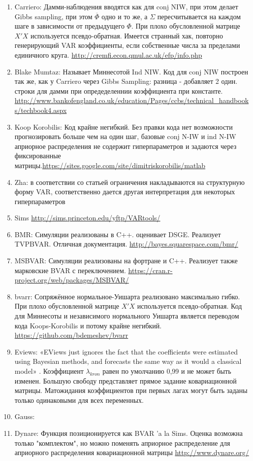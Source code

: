 \documentclass[11pt]{article} %
\newcommand{\post}{\overline}
\begin{document}
\begin{enumerate}
\item Carriero: Дамми-наблюдения вводятся как для conj NIW, при этом делает Gibbs sampling, при этом $\post\Phi$ одно и то же, а $\Sigma$ пересчитывается на каждом шаге в зависимости от предыдущего $\Phi$. При плохо обусловленной матрице $X'X$ используется псевдо-обратная. Имеется странный хак, повторно генерирующий VAR коэффициенты, если собственные числа за пределами единичного круга. \url{http://cremfi.econ.qmul.ac.uk/efp/info.php} 
\item Blake Mumtaz: Называет Миннесотой Ind NIW.  Код для conj NIW построен так же, как у Carriero через Gibbs Sampling: разница - добавляет 2 один. строки для дамми при опредеделеннии коэффициента при константе. \url{http://www.bankofengland.co.uk/education/Pages/ccbs/technical_handbooks/techbook4.aspx}
\item Koop Korobilis: Код крайне негибкий. Без правки кода нет возможности прогнозировать больше чем на один шаг, базовые conj N-IW и ind N-IW априорное распределения не содержит  гиперпараметров и задаются через фиксированные матрицы.\url{https://sites.google.com/site/dimitriskorobilis/matlab}\\
\item Zha: в соответствии со статьей ограничения накладываются на структурную форму VAR, соответственно дается другая интерпретация для некоторых гиперпараметров
\item Sims \url{http://sims.princeton.edu/yftp/VARtools/}
\item BMR: Симуляции реализованы в C++.  оценивает DSGE.  Реализует TVPBVAR. Отличная документация. \url{ http://bayes.squarespace.com/bmr/} 
\item MSBVAR: Симуляции реализованы на фортране и C++. Реализует также марковские BVAR с переключением.  \url{https://cran.r-project.org/web/packages/MSBVAR/ }
\item bvarr: Сопряжённое нормальное-Уишарта реализовано максимально гибко.  При плохо обусловленной матрице $X'X$ используется псевдо-обратная. Код для Миннесоты и независимого нормального Уишарта является переводом кода Koops-Korobilis и потому крайне негибкий. \url{https://github.com/bdemeshev/bvarr }
\item Eviews: «EViews just ignores the fact that the coefficients were estimated using Bayesian methods, and forecasts the same way as it would a classical model» . Коэффициент $\lambda_{kron}$ равен по умолчанию 0,99 и не может быть изменен. Большую свободу представляет прямое задание ковариационной матрицы. Матожидания коэффициентов при первых лагах могут быть заданы только одинаковыми для всех переменных. 
\item Gauss: 
\item Dynare: Функция позиционируется как BVAR 'a la Sims. Оценка возможна только "комплектом", но можно поменять априорное распределение для априорного распределения ковариационной матрицы  \url{http://www.dynare.org/}
\end{enumerate}
\newpage
\end{document}
